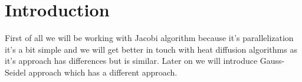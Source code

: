 \section{Introduction}
\justify
First of all we will be working with Jacobi algorithm because it's parallelization it's a bit simple and we will get better in touch with heat diffusion algorithms as it's approach has differences but is similar. Later on we will introduce Gauss-Seidel approach which has a different approach.

